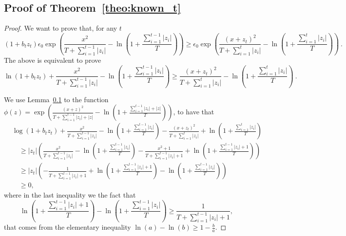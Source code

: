 \subsection{Proof of Theorem~\ref{theo:known_t}}
\begin{proof}
We want to prove that, for any $t$
\[
(1+b_t z_t) \epsilon_0 \exp\left(\frac{x^2}{T+\sum_{i=1}^{t-1} |z_i|} - \ln\left(1+\frac{\sum_{i=1}^{t-1} |z_i|}{T}\right)\right)
\geq \epsilon_0 \exp\left(\frac{(x+z_t)^2}{T+\sum_{i=1}^{t} |z_i|} - \ln\left(1+\frac{\sum_{i=1}^{t} |z_i|}{T}\right)\right)~.
\]
The above is equivalent to prove
\[
\ln(1+b_t z_t) + \frac{x^2}{T+\sum_{i=1}^{t-1} |z_i|} - \ln\left(1+\frac{\sum_{i=1}^{t-1} |z_i|}{T}\right)
\geq \frac{(x+z_t)^2}{T+\sum_{i=1}^{t} |z_i|} - \ln\left(1+\frac{\sum_{i=1}^{t} |z_i|}{T}\right)~.
\]

We use Lemma~\ref{} to the function $\phi(z)=\exp\left(\frac{(x+z)^2}{T+\sum_{i=1}^{t-1} |z_i|+ |z|}-\ln\left(1+\frac{\sum_{i=1}^{t-1} |z_i|+|z|}{T}  \right)\right)$, to have that 
\begin{align*}
&\log(1+b_t z_t) + \frac{x^2}{T+\sum_{i=1}^{t-1} |z_i|}- \ln\left(1+\frac{\sum_{i=1}^{t-1} |z_i|}{T}\right) -\frac{(x+z_t)^2}{T+\sum_{i=1}^{t} |z_i|} + \ln\left(1+\frac{\sum_{i=1}^{t} |z_i|}{T}\right) \\
&\quad \geq |z_t| \left(\frac{x^2}{T+\sum_{i=1}^{t-1} |z_i|} - \ln\left(1+\frac{\sum_{i=1}^{t-1} |z_i|}{T}\right) -\frac{x^2+1}{T+\sum_{i=1}^{t-1} |z_i|+1}+\ln\left(1+\frac{\sum_{i=1}^{t-1} |z_i|+1}{T}\right) \right)  \\
&\quad \geq |z_t| \left( -\frac{1}{T+\sum_{i=1}^{t-1} |z_i|+1}+\ln\left(1+\frac{\sum_{i=1}^{t-1} |z_i|+1}{T}  \right) - \ln\left(1+\frac{\sum_{i=1}^{t-1} |z_i|}{T}\right) \right) \\
&\quad \geq 0,
\end{align*}
where in the last inequality we the fact that 
\[
\ln\left(1+\frac{\sum_{i=1}^{t-1} |z_i|+1}{T}  \right) - \ln\left(1+\frac{\sum_{i=1}^{t-1} |z_i|}{T}\right) \geq \frac{1}{T+\sum_{i=1}^{t-1} |z_i|+1},
\]
that comes from the elementary inequality $\ln(a) -\ln(b) \geq 1-\frac{b}{a} $.
\end{proof}
